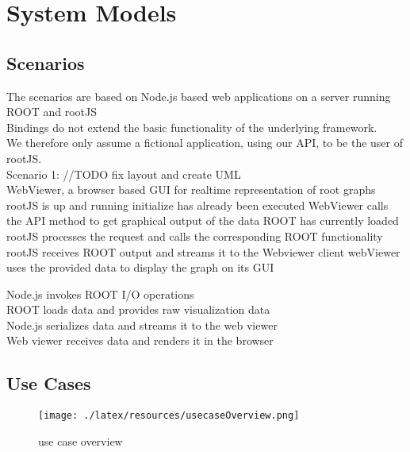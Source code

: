 \chapter{System Models}

\section{Scenarios}
The scenarios are based on Node.js based web applications on a server running ROOT and rootJS\\
Bindings do not extend the basic functionality of the underlying framework.\\
We therefore only assume a fictional application, using our API, to be the user of rootJS.\\


Scenario 1: //TODO fix layout and create UML\\
WebViewer, a browser based GUI for realtime representation of root graphs
	rootJS is up and running initialize has already been executed
	WebViewer calls the API method to get graphical output of the data ROOT has currently loaded
	\indent rootJS processes the request and calls the corresponding ROOT functionality
	\indent rootJS receives ROOT output and streams it to the Webviewer client
webViewer uses the provided data to display the graph on its GUI

\indent	Node.js invokes ROOT I/O operations\\
\indent \indent		ROOT loads data and provides raw visualization data\\
\indent	Node.js serializes data and streams it to the web viewer\\
Web viewer receives data and renders it in the browser\\

\section{Use Cases}
\begin{figure}[htb]
	\centering
	\texttt{[image: ./latex/resources/usecaseOverview.png]}
	\caption{use case overview}
\end{figure}

\pagebreak[4]

